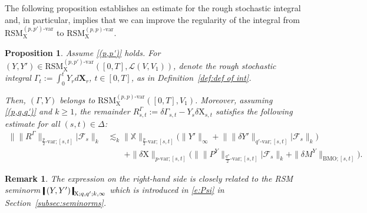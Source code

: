 \documentclass[11pt,reqno]{amsart}
\newtheorem{remark}[lemma]{Remark}
\newtheorem{proposition}[lemma]{Proposition}
\numberwithin{equation}{section}
\newcommand{\shortthickbar}{%
  \vcenter{\hbox{\rule{1.8pt}{2.2ex}}}%
}
\newcommand{\thicknm}[1]{%
  \mathopen{\shortthickbar}%
  \mkern4mu #1 \mkern4mu%
  \mathclose{\shortthickbar}%
}
\begin{document}
The following proposition establishes an estimate for the rough stochastic integral and, in particular, implies that we can improve the regularity of the integral from $\mathrm{RSM}^{(p,p')\text{-}\mathrm{var}}_{\mathrm X}$ to $\mathrm{RSM}^{(p,p)\text{-}\mathrm{var}}_{\mathrm X}$.

\begin{proposition}\label{prop:estim of integral}
Assume \ref{(p,p')} holds. For $(Y,Y')\in\mathrm{RSM}^{(p,p')\text{-}\mathrm{var}}_{\mathrm X}([0,T], \mathscr L(V,V_1) )$, denote the rough stochastic integral $\Gamma_{t} := \int_{0}^{t}Y_{r}d\mathbf X_r$, $t\in[0,T]$,
as in Definition~\ref{def:def of int}.  

Then, $(\Gamma,Y)$ belongs to $\mathrm{RSM}^{(p,p)\text{-}\mathrm{var}}_{\mathrm X}([0,T],V_1)$. Moreover, assuming \ref{(p,q,q')} and $k\ge 1$, the remainder $R^{\Gamma}_{s,t} := \delta\Gamma_{s,t} - Y_{s}\delta\mathrm X_{s,t}$ satisfies the following estimate for all $(s,t) \in \Delta$:
\begin{equation*}
\begin{aligned}
\big\| \|R^{\Gamma}\|_{\frac{p}{2}\text{-}\mathrm{var};[s,t]} \big| \mathcal F_{s} \big\|_{k}  &\lesssim_{k} \|\mathbb X\|_{\frac{p}{2}\text{-}\mathrm{var};[s,t]}  \big( \|Y'\|_{\infty} + \big\|\|\delta Y'\|_{q'\text{-}\mathrm{var};[s,t]}\big|\mathcal F_{s}\big\|_{k} \big)\\
&\qquad + \|\delta \mathrm X\|_{p\text{-}\mathrm{var};[s,t]} \Big( \big\|\|P^Y\|_{\frac{q''}{2}\text{-}\mathrm{var};[s,t]}\big|\mathcal F_{s}\big\|_{k} + \|\delta M^{Y}\|_{\mathrm{BMO};[s,t]} \Big).  
\end{aligned}
\end{equation*}
\end{proposition}

\begin{remark}\label{rem:for Psi}
The expression on the right-hand side is closely related to the \emph{RSM} seminorm $\thicknm{(Y,Y')}_{\mathrm X;q,q';k,\infty}$ which is introduced in \eqref{e:Psi} in Section~\ref{subsec:seminorms}.
\end{remark}
\end{document}
